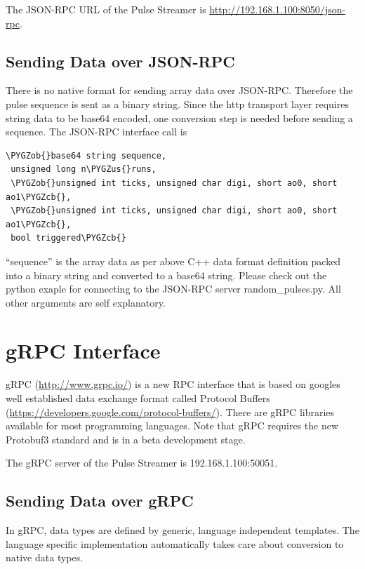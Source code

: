 \documentclass[letterpaper,10pt,english]{sphinxmanual}
\def\PYGZus{\char`\_}
\def\PYGZob{\char`\{}
\def\PYGZcb{\char`\}}
\begin{document}
The JSON-RPC URL of the Pulse Streamer is \href{http://192.168.1.100:8050/json-rpc}{http://192.168.1.100:8050/json-rpc}.


\subsection{Sending Data over JSON-RPC}
\label{sections/interface:sending-data-over-json-rpc}
There is no native format for sending array data over JSON-RPC. Therefore the pulse sequence
is sent as a binary string. Since the http transport layer requires string data to be base64 encoded,
one conversion step is needed before sending a sequence. The JSON-RPC interface call is

\begin{Verbatim}[commandchars=\\\{\}]
\PYGZob{}base64 string sequence,
 unsigned long n\PYGZus{}runs,
 \PYGZob{}unsigned int ticks, unsigned char digi, short ao0, short ao1\PYGZcb{},
 \PYGZob{}unsigned int ticks, unsigned char digi, short ao0, short ao1\PYGZcb{},
 bool triggered\PYGZcb{}
\end{Verbatim}

``sequence'' is the array data as per above C++ data format definition packed into a binary string and converted
to a base64 string. Please check out the python exaple for connecting to the JSON-RPC server
random\_pulses.py.
All other arguments are self explanatory.


\section{gRPC Interface}
\label{sections/interface:grpc-interface}
gRPC (\href{http://www.grpc.io/}{http://www.grpc.io/}) is a new RPC interface that is based on googles well established
data exchange format called Protocol Buffers (\href{https://developers.google.com/protocol-buffers/}{https://developers.google.com/protocol-buffers/}).
There are gRPC libraries available
for most programming languages. Note that gRPC requires the new Protobuf3
standard and is in a beta development stage.

The gRPC server of the Pulse Streamer is 192.168.1.100:50051.


\subsection{Sending Data over gRPC}
\label{sections/interface:sending-data-over-grpc}
In gRPC, data types are defined by generic, language independent templates.
The language specific implementation automatically takes care about conversion
to native data types.
\end{document}
